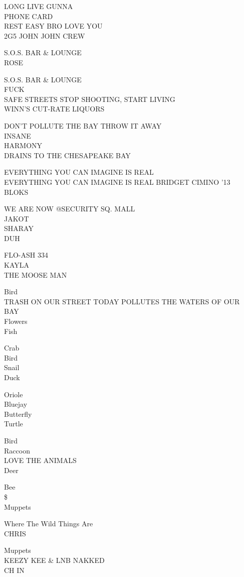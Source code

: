 \documentclass[10pt,letterpaper]{article}
\begin{document}
LONG LIVE GUNNA\\
PHONE CARD\\
REST EASY BRO LOVE YOU\\
2G5 JOHN JOHN CREW

S.O.S. BAR \& LOUNGE\\
ROSE

S.O.S. BAR \& LOUNGE\\
FUCK\\
SAFE STREETS STOP SHOOTING, START LIVING\\
WINN'S CUT{-}RATE LIQUORS

DON'T POLLUTE THE BAY THROW IT AWAY\\
INSANE\\
HARMONY\\
DRAINS TO THE CHESAPEAKE BAY

EVERYTHING YOU CAN IMAGINE IS REAL\\
EVERYTHING YOU CAN IMAGINE IS REAL BRIDGET CIMINO '13\\
BLOKS

WE ARE NOW @SECURITY SQ. MALL\\
JAKOT\\
SHARAY\\
DUH

FLO{-}ASH 334\\
KAYLA\\
THE MOOSE MAN

Bird\\
TRASH ON OUR STREET TODAY POLLUTES THE WATERS OF OUR BAY\\
Flowers\\
Fish

Crab\\
Bird\\
Snail\\
Duck

Oriole\\
Bluejay\\
Butterfly\\
Turtle

Bird\\
Raccoon\\
LOVE THE ANIMALS\\
Deer

Bee\\
\$\\
Muppets

Where The Wild Things Are\\
CHRIS

Muppets\\
KEEZY KEE \& LNB NAKKED\\
CH IN
\end{document}
